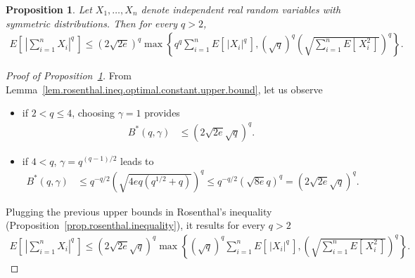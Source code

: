 \documentclass[twoside,11pt]{article}
\numberwithin{equation}{section}
\newtheorem{prop}{Proposition}[section]
\newcommand{\1}{\mathds{1}}%
\newcommand{\paren}[1]{\left( #1 \right)}
\newcommand{\croch}[1]{\left[\, #1 \,\right]}
\newcommand{\acc}[1]{\left\{ #1 \right\}}
\newcommand{\abs}[1]{\left\lvert #1 \right\rvert} %
\numberwithin{equation}{section}
\theoremstyle{plain}
\begin{document}
\medskip


\begin{prop}
%
\label{prop.rosenthal.inequality.upper.bound}
%
Let $X_1,\ldots,X_n$ denote independent real random variables with symmetric distributions.
%
Then for every $q>2$,
\begin{align*}
    E\croch{ \abs{\sum_{i=1}^n X_i}^q } \leq \paren{ 2\sqrt{2e} }^q  \max\acc{ q^{q} \sum_{i=1}^n E\croch{\abs{X_i}^q} , \paren{\sqrt{q} }^q  \paren{ \sqrt{ \sum_{i=1}^n E\croch{X_i^2} } }^q  } .
\end{align*}

\end{prop}

\begin{proof}[Proof of Proposition~\ref{prop.rosenthal.inequality.upper.bound}]

From Lemma~\ref{lem.rosenthal.ineq.optimal.constant.upper.bound}, let us observe
\begin{itemize}
  \item if $2<q\leq 4$, choosing $\gamma=1$ provides
\begin{align*}
  B^*(q,\gamma) & \leq \paren{2 \sqrt{2e} \sqrt{q} }^{q} .
\end{align*}


  \item if $4<q$, $\gamma= q^{(q-1)/2}$ leads to
\begin{align*}
  B^*(q,\gamma) & \leq  q^{-q/2}  \paren{ \sqrt{ 4e q \paren{ q^{1/2} + q} } }^q \leq  q^{-q/2}  \paren{ \sqrt{8e} q }^q = \paren{ 2\sqrt{2e} \sqrt{q} }^q .
\end{align*}
\end{itemize}
%
Plugging the previous upper bounds in Rosenthal's inequality (Proposition~\ref{prop.rosenthal.inequality}), it results for every $q>2$
\begin{align*}
  E\croch{ \abs{\sum_{i=1}^n X_i}^q } \leq \paren{ 2\sqrt{2e} \sqrt{q} }^q \max\acc{ \paren{\sqrt{q} }^{q} \sum_{i=1}^n E\croch{\abs{X_i}^q} , \paren{ \sqrt{ \sum_{i=1}^n E\croch{X_i^2} } }^q  } .
\end{align*}

\end{proof}






\medskip
\end{document}
